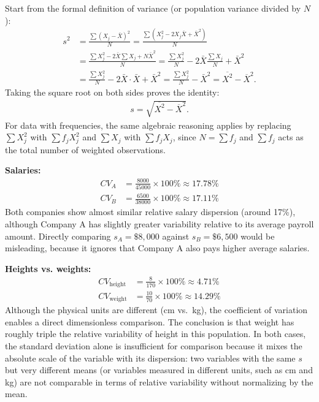 \begin{solproblema}[prob:6112df0]
	Start from the formal definition of variance (or population variance divided by $N$):
	\begin{align}
		s^2 &= \frac{\sum (X_j - \bar{X})^2}{N} = \frac{\sum (X_j^2 - 2X_j\bar{X} + \bar{X}^2)}{N} \\
		&= \frac{\sum X_j^2 - 2\bar{X}\sum X_j + N\bar{X}^2}{N} = \frac{\sum X_j^2}{N} - 2\bar{X}\frac{\sum X_j}{N} + \bar{X}^2 \\
		&= \frac{\sum X_j^2}{N} - 2\bar{X}\cdot\bar{X} + \bar{X}^2 = \frac{\sum X_j^2}{N} - \bar{X}^2 = \overline{X^2} - \overline{X}^2.
	\end{align}
	Taking the square root on both sides proves the identity:
	\begin{align}
		s = \sqrt{\overline{X^2} - \overline{X}^2}.
	\end{align}
	For data with frequencies, the same algebraic reasoning applies by replacing $\sum X_j^2$ with $\sum f_j X_j^2$ and $\sum X_j$ with $\sum f_j X_j$, since $N=\sum f_j$ and $\sum f_j$ acts as the total number of weighted observations.
\end{solproblema}

\begin{solproblema}[prob:dd18a2e]
	\textbf{Salaries:}
	\begin{align}
		CV_A &= \frac{8000}{45000} \times 100\% \approx 17.78\% \\
		CV_B &= \frac{6500}{38000} \times 100\% \approx 17.11\%
	\end{align}
	Both companies show almost similar relative salary dispersion (around 17\%), although Company A has slightly greater variability relative to its average payroll amount. Directly comparing $s_A=\$8{,}000$ against $s_B=\$6{,}500$ would be misleading, because it ignores that Company A also pays higher average salaries.

	\textbf{Heights vs. weights:}
	\begin{align}
		CV_{\text{height}} &= \frac{8}{170} \times 100\% \approx 4.71\% \\
		CV_{\text{weight}} &= \frac{10}{70} \times 100\% \approx 14.29\%
	\end{align}
	Although the physical units are different (cm vs.\ kg), the coefficient of variation enables a direct dimensionless comparison. The conclusion is that weight has roughly triple the relative variability of height in this population. In both cases, the standard deviation alone is insufficient for comparison because it mixes the absolute scale of the variable with its dispersion: two variables with the same $s$ but very different means (or variables measured in different units, such as cm and kg) are not comparable in terms of relative variability without normalizing by the mean.
\end{solproblema}

